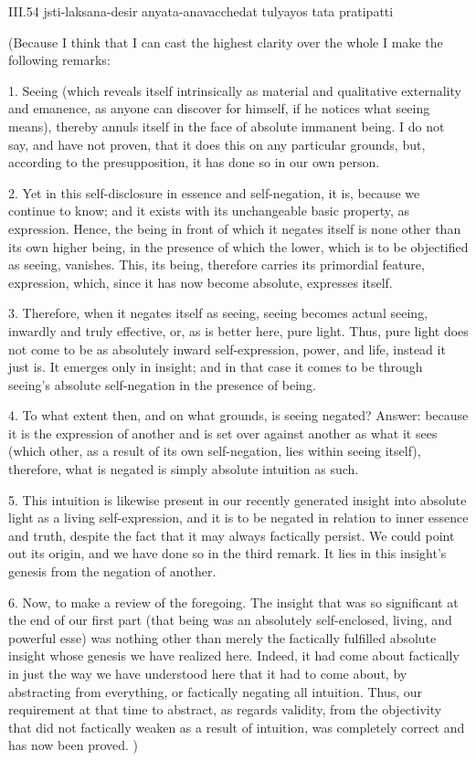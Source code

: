 III.54
jsti-laksana-desir anyata-anavacchedat tulyayos tata pratipatti

(Because I think that I can cast
the highest clarity over the whole
I make the following remarks:

1. Seeing
(which reveals itself intrinsically
as material and qualitative externality and emanence,
as anyone can discover for himself,
if he notices what seeing means),
thereby annuls itself in the face
of absolute immanent being.
I do not say, and have not proven,
that it does this on any particular grounds,
but, according to the presupposition,
it has done so in our own person.

2.  Yet in this self-disclosure
in essence and self-negation,
it is, because we continue to know;
and it exists with its unchangeable basic property,
as expression.
Hence, the being in front of which
it negates itself is none other
than its own higher being,
in the presence of which the lower,
which is to be objectified as seeing, vanishes.
This, its being, therefore carries its
primordial feature, expression,
which, since it has now become absolute,
expresses itself.

3. Therefore, when it negates itself as seeing,
seeing becomes actual seeing,
inwardly and truly effective,
or, as is better here, pure light.
Thus, pure light does not come to be as
absolutely inward self-expression, power, and life,
instead it just is.
It emerges only in insight;
and in that case it comes to be
through seeing’s absolute self-negation
in the presence of being.

4. To what extent then,
and on what grounds,
is seeing negated?
Answer: because it is the expression of another
and is set over against another as what it sees
(which other, as a result of its own self-negation,
lies within seeing itself),
therefore, what is negated
is simply absolute intuition as such.

5. This intuition is likewise present
in our recently generated insight into
absolute light as a living self-expression,
and it is to be negated in relation to
inner essence and truth,
despite the fact that it may
always factically persist.
We could point out its origin,
and we have done so in the third remark.
It lies in this insight’s genesis
from the negation of another.

6. Now, to make a review of the foregoing.
The insight that was so significant
at the end of our first part
(that being was an absolutely
self-enclosed, living, and powerful esse)
was nothing other than merely
the factically fulfilled absolute insight
whose genesis we have realized here.
Indeed, it had come about factically
in just the way we have understood
here that it had to come about,
by abstracting from everything,
or factically negating all intuition.
Thus, our requirement at that time to abstract,
as regards validity, from the objectivity
that did not factically weaken as a result of intuition,
was completely correct and has now been proved.
)

